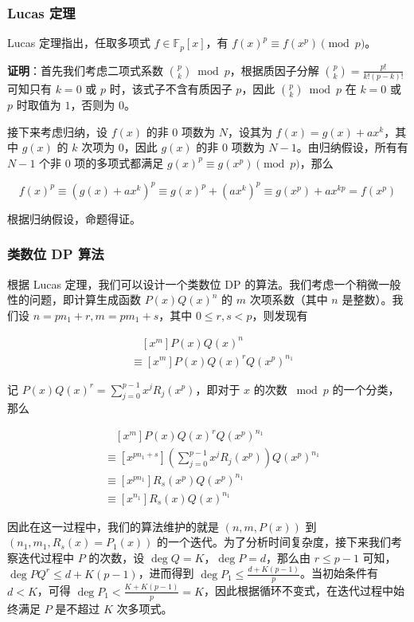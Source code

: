\documentclass[12pt]{ctexart}
\begin{document}
\subsubsection{Lucas 定理}

Lucas 定理指出，任取多项式 $f\in \mathbb F_p[x]$，有 $f(x)^p \equiv f(x^p) \pmod p$。

\textbf{证明}：首先我们考虑二项式系数 $\binom p k \bmod p$，根据质因子分解 $\binom pk = \frac{p!}{k!(p-k)!}$ 可知只有 $k=0$ 或 $p$ 时，该式子不含有质因子 $p$，因此 $\binom p k \bmod p$ 在 $k=0$ 或 $p$ 时取值为 $1$，否则为 $0$。

接下来考虑归纳，设 $f(x)$ 的非 $0$ 项数为 $N$，设其为 $f(x)=g(x)+ax^k$，其中 $g(x)$ 的 $k$ 次项为 $0$，因此 $g(x)$ 的非 $0$ 项数为 $N-1$。由归纳假设，所有有 $N-1$ 个非 $0$ 项的多项式都满足 $g(x)^p\equiv g(x^p)\pmod p$，那么

$$
f(x)^p \equiv (g(x)+ax^k)^p \equiv g(x)^p + (ax^k)^p \equiv g(x^p) + ax^{kp} = f(x^p)
$$

根据归纳假设，命题得证。

\subsubsection{类数位 DP 算法}

根据 Lucas 定理，我们可以设计一个类数位 DP 的算法。我们考虑一个稍微一般性的问题，即计算生成函数 $P(x)Q(x)^n$ 的 $m$ 次项系数（其中 $n$ 是整数）。我们设 $n=pn_1+r, m = pm_1 + s$，其中 $0\le r,s <p$，则发现有

\begin{align*}
&\quad [x^m]P(x)Q(x)^n\\
&\equiv [x^m]P(x)Q(x)^rQ(x^p)^{n_1}
\end{align*}

记 $P(x)Q(x)^r=\sum_{j=0}^{p-1} x^jR_j(x^p)$，即对于 $x$ 的次数 $\bmod p$ 的一个分类，那么

\begin{align*}
&\quad [x^m]P(x)Q(x)^rQ(x^p)^{n_1}\\
&\equiv [x^{pn_1+s}]\left(\sum_{j=0}^{p-1} x^jR_j(x^p)\right)Q(x^p)^{n_1}\\
&\equiv [x^{pn_1}]R_s(x^p)Q(x^p)^{n_1}\\
&\equiv [x^{n_1}]R_s(x)Q(x)^{n_1}
\end{align*}

因此在这一过程中，我们的算法维护的就是 $(n,m,P(x))$ 到 $(n_1,m_1,R_s(x)=P_1(x))$ 的一个迭代。为了分析时间复杂度，接下来我们考察迭代过程中 $P$ 的次数，设 $\deg Q=K$，$\deg P = d$，那么由 $r\le p-1$ 可知，$\deg PQ^r \le d+K(p-1)$，进而得到 $\deg P_1 \le \frac{d + K(p-1)}p$。当初始条件有 $d<K$，可得 $\deg P_1 < \frac{K+K(p-1)}p = K$，因此根据循环不变式，在迭代过程中始终满足 $P$ 是不超过 $K$ 次多项式。
\end{document}
